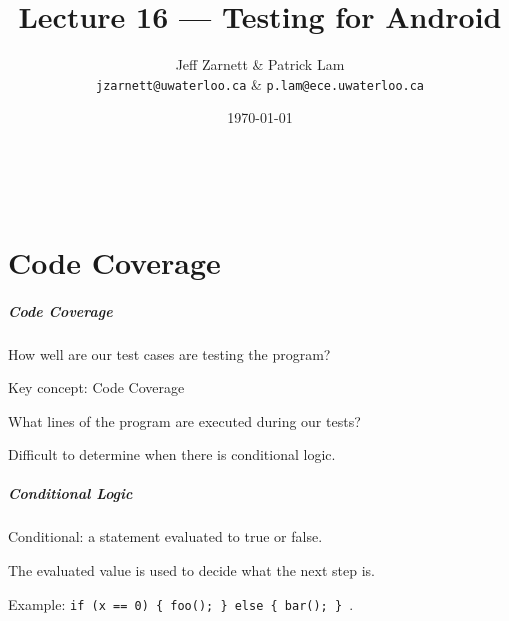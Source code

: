 
\usepackage{alltt}

\title{Lecture 16 --- Testing for Android}

\author{Jeff Zarnett \& Patrick Lam \\ \small \texttt{jzarnett@uwaterloo.ca} \& \texttt{p.lam@ece.uwaterloo.ca}}
\date{\today}



\begin{frame}
  \titlepage

  \vfill
  \begin{center}
    \\
                  {\tiny\CcNote{\CcLongnameByNcSa}}
                  \vspace*{-2.5ex}
  \end{center}

\end{frame}

\part{Code Coverage}
\frame{\partpage}

\begin{frame}
\frametitle{Code Coverage}
\begin{changemargin}{1cm}
How well are our test cases are testing the program?

Key concept: \alert{Code Coverage}

What lines of the program are executed during our tests?

Difficult to determine when there is conditional logic.

\end{changemargin}
\end{frame}


\begin{frame}
\frametitle{Conditional Logic}
\begin{changemargin}{1cm}
Conditional: a statement evaluated to true or false.

The evaluated value is used to decide what the next step is.

Example: \texttt{if (x == 0) \{ foo(); \} else \{ bar(); \} }.

\end{changemargin}
\end{frame}

